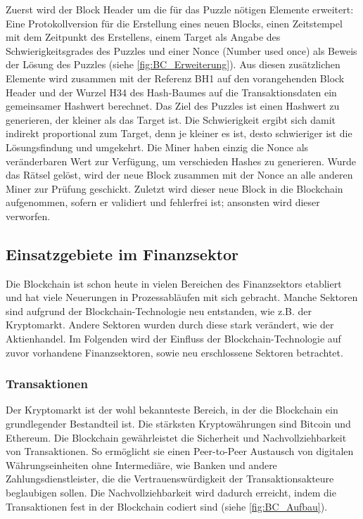Zuerst wird der Block Header um die für das Puzzle nötigen Elemente 
erweitert: Eine Protokollversion für die Erstellung eines neuen Blocks, einen Zeitstempel mit
dem Zeitpunkt des Erstellens, einem Target als Angabe des Schwierigkeitsgrades des Puzzles
und einer Nonce (Number used once) als Beweis der Lösung des Puzzles (siehe \autoref{fig:BC_Erweiterung}).
Aus diesen zusätzlichen Elemente wird zusammen mit der Referenz BH1 auf den vorangehenden 
Block Header und der Wurzel H34 des Hash-Baumes auf die Transaktionsdaten ein gemeinsamer 
Hashwert berechnet. 
Das Ziel des Puzzles ist einen Hashwert zu generieren, der kleiner als das Target ist. Die 
Schwierigkeit ergibt sich damit indirekt proportional zum Target, denn je kleiner es ist, desto
schwieriger ist die Lösungsfindung und umgekehrt.
Die Miner haben einzig die Nonce als veränderbaren Wert zur Verfügung, um verschieden Hashes zu generieren. 
Wurde das Rätsel gelöst, wird der neue Block zusammen mit der Nonce an alle anderen Miner zur Prüfung
geschickt.
Zuletzt wird dieser neue Block in die Blockchain aufgenommen, sofern er validiert und 
fehlerfrei ist; ansonsten wird dieser verworfen.
\cite[p.~22ff]{fill2020blockchain}


\subsection{Einsatzgebiete im Finanzsektor}
Die Blockchain ist schon heute in vielen Bereichen des Finanzsektors etabliert und hat viele Neuerungen
in Prozessabläufen mit sich gebracht. Manche Sektoren sind aufgrund der Blockchain-Technologie neu entstanden, 
wie z.B. der Kryptomarkt. Andere Sektoren wurden durch diese stark verändert, wie der Aktienhandel. 
Im Folgenden wird der Einfluss der Blockchain-Technologie auf zuvor vorhandene Finanzsektoren, sowie neu erschlossene Sektoren 
betrachtet.

\subsubsection{Transaktionen}
Der Kryptomarkt ist der wohl bekannteste Bereich, in der die Blockchain ein 
grundlegender Bestandteil ist. 
Die stärksten Kryptowährungen sind Bitcoin und Ethereum. 
Die Blockchain gewährleistet die Sicherheit und Nachvollziehbarkeit von Transaktionen.
\cite[p.~168]{chowdhary2025smart}
So ermöglicht sie einen Peer-to-Peer Austausch von digitalen
Währungseinheiten ohne Intermediäre, wie Banken und andere Zahlungsdienstleister,
die die Vertrauenswürdigkeit der Transaktionsakteure beglaubigen sollen.
\cite[p.~32]{fill2020blockchain}
Die Nachvollziehbarkeit wird dadurch erreicht, indem die Transaktionen fest in der 
Blockchain codiert sind (siehe \autoref{fig:BC_Aufbau}).

